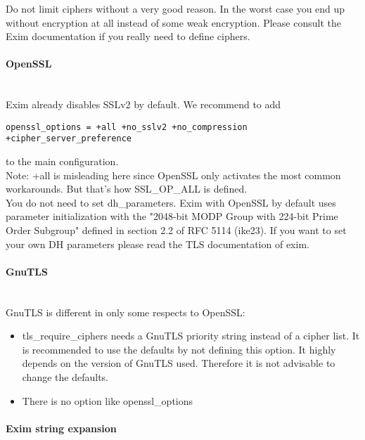 Do not limit ciphers without a very good reason. In the worst case you end up without encryption at all instead of some weak encryption. Please consult the Exim documentation if you really need to define ciphers.

\paragraph*{OpenSSL}\mbox{}\\
Exim already disables SSLv2 by default. We recommend to add
\begin{lstlisting}[breaklines]
  openssl_options = +all +no_sslv2 +no_compression +cipher_server_preference
\end{lstlisting}
to the main configuration.\\
Note: +all is misleading here since OpenSSL only activates the most common workarounds. But that's how SSL\_OP\_ALL is defined.\\

You do not need to set dh\_parameters. Exim with OpenSSL by default uses parameter initialization with the "2048-bit MODP Group with 224-bit Prime Order Subgroup" defined in section 2.2 of RFC 5114 (ike23).
If you want to set your own DH parameters please read the TLS documentation of exim.\\



\paragraph*{GnuTLS}\mbox{}\\

GnuTLS is different in only some respects to OpenSSL:
\begin{itemize}
\item tls\_require\_ciphers needs a GnuTLS priority string instead of a cipher list. It is recommended to use the defaults by not defining this option. It highly depends on the version of GnuTLS used. Therefore it is not advisable to change the defaults.
\item There is no option like openssl\_options
\end{itemize}

\paragraph*{Exim string expansion}\mbox{}\\

